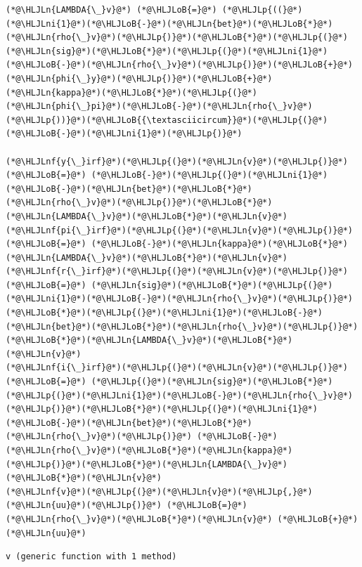 \documentclass[12pt,a4paper]{article}
\newcommand{\HLJLn}[1]{#1}
\newcommand{\HLJLnf}[1]{\textcolor[RGB]{66,102,213}{#1}}
\newcommand{\HLJLni}[1]{\textcolor[RGB]{59,151,46}{#1}}
\newcommand{\HLJLoB}[1]{\textcolor[RGB]{102,102,102}{\textbf{#1}}}
\newcommand{\HLJLp}[1]{#1}
\begin{document}
\begin{lstlisting}
(*@\HLJLn{LAMBDA{\_}v}@*) (*@\HLJLoB{=}@*) (*@\HLJLp{((}@*)(*@\HLJLni{1}@*)(*@\HLJLoB{-}@*)(*@\HLJLn{bet}@*)(*@\HLJLoB{*}@*)(*@\HLJLn{rho{\_}v}@*)(*@\HLJLp{)}@*)(*@\HLJLoB{*}@*)(*@\HLJLp{(}@*)(*@\HLJLn{sig}@*)(*@\HLJLoB{*}@*)(*@\HLJLp{(}@*)(*@\HLJLni{1}@*)(*@\HLJLoB{-}@*)(*@\HLJLn{rho{\_}v}@*)(*@\HLJLp{)}@*)(*@\HLJLoB{+}@*)(*@\HLJLn{phi{\_}y}@*)(*@\HLJLp{)}@*)(*@\HLJLoB{+}@*)(*@\HLJLn{kappa}@*)(*@\HLJLoB{*}@*)(*@\HLJLp{(}@*)(*@\HLJLn{phi{\_}pi}@*)(*@\HLJLoB{-}@*)(*@\HLJLn{rho{\_}v}@*)(*@\HLJLp{))}@*)(*@\HLJLoB{{\textasciicircum}}@*)(*@\HLJLp{(}@*)(*@\HLJLoB{-}@*)(*@\HLJLni{1}@*)(*@\HLJLp{)}@*)

(*@\HLJLnf{y{\_}irf}@*)(*@\HLJLp{(}@*)(*@\HLJLn{v}@*)(*@\HLJLp{)}@*) (*@\HLJLoB{=}@*) (*@\HLJLoB{-}@*)(*@\HLJLp{(}@*)(*@\HLJLni{1}@*)(*@\HLJLoB{-}@*)(*@\HLJLn{bet}@*)(*@\HLJLoB{*}@*)(*@\HLJLn{rho{\_}v}@*)(*@\HLJLp{)}@*)(*@\HLJLoB{*}@*)(*@\HLJLn{LAMBDA{\_}v}@*)(*@\HLJLoB{*}@*)(*@\HLJLn{v}@*)
(*@\HLJLnf{pi{\_}irf}@*)(*@\HLJLp{(}@*)(*@\HLJLn{v}@*)(*@\HLJLp{)}@*) (*@\HLJLoB{=}@*) (*@\HLJLoB{-}@*)(*@\HLJLn{kappa}@*)(*@\HLJLoB{*}@*)(*@\HLJLn{LAMBDA{\_}v}@*)(*@\HLJLoB{*}@*)(*@\HLJLn{v}@*)
(*@\HLJLnf{r{\_}irf}@*)(*@\HLJLp{(}@*)(*@\HLJLn{v}@*)(*@\HLJLp{)}@*) (*@\HLJLoB{=}@*) (*@\HLJLn{sig}@*)(*@\HLJLoB{*}@*)(*@\HLJLp{(}@*)(*@\HLJLni{1}@*)(*@\HLJLoB{-}@*)(*@\HLJLn{rho{\_}v}@*)(*@\HLJLp{)}@*)(*@\HLJLoB{*}@*)(*@\HLJLp{(}@*)(*@\HLJLni{1}@*)(*@\HLJLoB{-}@*)(*@\HLJLn{bet}@*)(*@\HLJLoB{*}@*)(*@\HLJLn{rho{\_}v}@*)(*@\HLJLp{)}@*)(*@\HLJLoB{*}@*)(*@\HLJLn{LAMBDA{\_}v}@*)(*@\HLJLoB{*}@*)(*@\HLJLn{v}@*)
(*@\HLJLnf{i{\_}irf}@*)(*@\HLJLp{(}@*)(*@\HLJLn{v}@*)(*@\HLJLp{)}@*) (*@\HLJLoB{=}@*) (*@\HLJLp{(}@*)(*@\HLJLn{sig}@*)(*@\HLJLoB{*}@*)(*@\HLJLp{(}@*)(*@\HLJLni{1}@*)(*@\HLJLoB{-}@*)(*@\HLJLn{rho{\_}v}@*)(*@\HLJLp{)}@*)(*@\HLJLoB{*}@*)(*@\HLJLp{(}@*)(*@\HLJLni{1}@*)(*@\HLJLoB{-}@*)(*@\HLJLn{bet}@*)(*@\HLJLoB{*}@*)(*@\HLJLn{rho{\_}v}@*)(*@\HLJLp{)}@*) (*@\HLJLoB{-}@*) (*@\HLJLn{rho{\_}v}@*)(*@\HLJLoB{*}@*)(*@\HLJLn{kappa}@*)(*@\HLJLp{)}@*)(*@\HLJLoB{*}@*)(*@\HLJLn{LAMBDA{\_}v}@*)(*@\HLJLoB{*}@*)(*@\HLJLn{v}@*)
(*@\HLJLnf{v}@*)(*@\HLJLp{(}@*)(*@\HLJLn{v}@*)(*@\HLJLp{,}@*)(*@\HLJLn{uu}@*)(*@\HLJLp{)}@*) (*@\HLJLoB{=}@*) (*@\HLJLn{rho{\_}v}@*)(*@\HLJLoB{*}@*)(*@\HLJLn{v}@*) (*@\HLJLoB{+}@*) (*@\HLJLn{uu}@*)
\end{lstlisting}

\begin{lstlisting}
v (generic function with 1 method)
\end{lstlisting}
\end{document}
